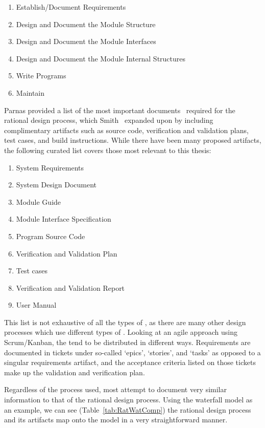 \begin{enumerate}
\item Establish/Document Requirements
\item Design and Document the Module Structure
\item Design and Document the Module Interfaces
\item Design and Document the Module Internal Structures
\item Write Programs
\item Maintain
\end{enumerate}

Parnas provided a list of the most important documents~\cite{Parnas2010} 
required for the rational design process, which 
Smith~\cite{SmithAndKoothoor2016} expanded upon by including complimentary 
artifacts such as source code, verification and validation plans, test cases, 
and build instructions. While there have been many proposed artifacts, the 
following curated list covers those most relevant to this thesis:

\begin{enumerate}
\item System Requirements
\item System Design Document
\item Module Guide
\item Module Interface Specification
\item Program Source Code
\item Verification and Validation Plan
\item Test cases
\item Verification and Validation Report
\item User Manual
\end{enumerate}

This list is not exhaustive of all the types of \sfs{}, as there are many other
design processes which use different types of \sfs{}. Looking at an agile 
approach using Scrum/Kanban, the \sfs{} tend to be distributed in different 
ways. Requirements are documented in tickets under so-called `epics', 
`stories', and `tasks' as opposed to a singular requirements artifact, and the 
acceptance criteria listed on those tickets make up the validation and 
verification plan. 

Regardless of the process used, most attempt to document very similar 
information to that of the rational design process. Using the waterfall model 
as an example, we can see (Table~\ref{tab:RatWatComp}) the rational design 
process and its artifacts map onto the model in a very straightforward manner.

